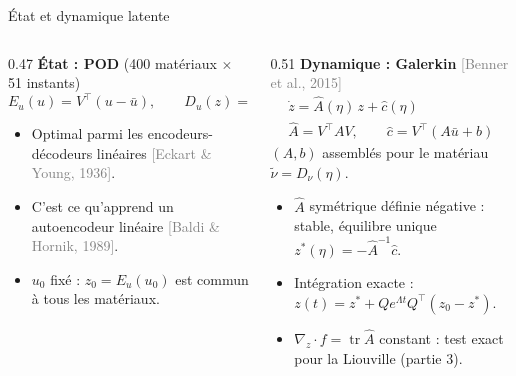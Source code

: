 \documentclass[aspectratio=169, 11pt]{beamer}
\newcommand{\ubar}{\bar u}
\newcommand{\Ah}{\hat A}
\newcommand{\ch}{\hat c}
\newcommand{\cit}[1]{{\footnotesize\textcolor{gray}{[#1]}}}   %
\begin{document}
\begin{frame}{État et dynamique latente}
  \begin{columns}[T]
    \begin{column}{0.47\textwidth}
      \textbf{État : POD} {\small (400 matériaux $\times$ 51 instants)}
      \[ E_u(u) = V^\top(u - \ubar), \qquad D_u(z) = \ubar + V z \]
      \begin{itemize}\small
        \item Optimal parmi les encodeurs-décodeurs linéaires \cit{Eckart \& Young, 1936}.
        \item C'est ce qu'apprend un autoencodeur linéaire \cit{Baldi \& Hornik, 1989}.
        \item $u_0$ fixé : $z_0 = E_u(u_0)$ est commun à tous les matériaux.
      \end{itemize}
    \end{column}
    \begin{column}{0.51\textwidth}
      \textbf{Dynamique : Galerkin} \cit{Benner et al., 2015}
      \begin{gather*}
        \dot z = \Ah(\eta)\,z + \ch(\eta) \\
        \Ah = V^\top A V, \qquad \ch = V^\top(A\ubar + b)
      \end{gather*}
      {\small $(A, b)$ assemblés pour le matériau $\tilde\nu = D_\nu(\eta)$.}
      \begin{itemize}\small
        \item $\Ah$ symétrique définie négative : \alert{stable}, équilibre unique $z^*(\eta) = -\Ah^{-1}\ch$.
        \item Intégration exacte : $z(t) = z^* + Q e^{\Lambda t} Q^\top (z_0 - z^*)$.
        \item $\nabla_z \cdot f = \operatorname{tr}\Ah$ constant : test exact pour la Liouville (partie 3).
      \end{itemize}
    \end{column}
  \end{columns}
\end{frame}
\end{document}
